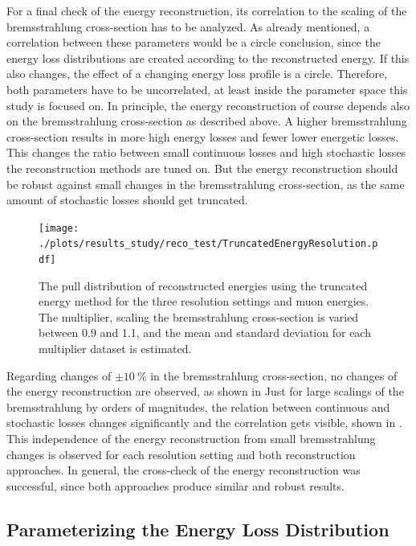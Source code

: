For a final check of the energy reconstruction, its correlation to the scaling of the bremsstrahlung cross-section has to be analyzed.
As already mentioned, a correlation between these parameters would be a circle conclusion, since the energy loss distributions are created according to the reconstructed energy.
If this also changes, the effect of a changing energy loss profile is a circle.
Therefore, both parameters have to be uncorrelated, at least inside the parameter space this study is focused on.
In principle, the energy reconstruction of course depends also on the bremsstrahlung cross-section as described above.
A higher bremsstrahlung cross-section results in more high energy losses and fewer lower energetic losses.
This changes the ratio between small continuous losses and high stochastic losses the reconstruction methods are tuned on.
But the energy reconstruction should be robust against small changes in the bremsstrahlung cross-section, as the same amount of stochastic losses should get truncated.
\begin{figure}
    \centering
    \texttt{[image: ./plots/results\_study/reco\_test/TruncatedEnergyResolution.pdf]}
    \caption{The pull distribution of reconstructed energies using the truncated energy method for the three resolution settings and muon energies. The multiplier, scaling the bremsstrahlung cross-section is varied between \num{0.9} and \num{1.1}, and the mean and standard deviation for each multiplier dataset is estimated.}
    \label{fig:study_ereco_pull_te}
\end{figure}

Regarding changes of $\pm \SI{10}{\percent}$ in the bremsstrahlung cross-section, no changes of the energy reconstruction are observed, as shown in 
Just for large scalings of the bremsstrahlung by orders of magnitudes, the relation between continuous and stochastic losses changes significantly and the correlation gets visible, shown in .
This independence of the energy reconstruction from small bremsstrahlung changes is observed for each resolution setting and both reconstruction approaches.
In general, the cross-check of the energy reconstruction was successful, since both approaches produce similar and robust results.

%

\subsection{Parameterizing the Energy Loss Distribution}

